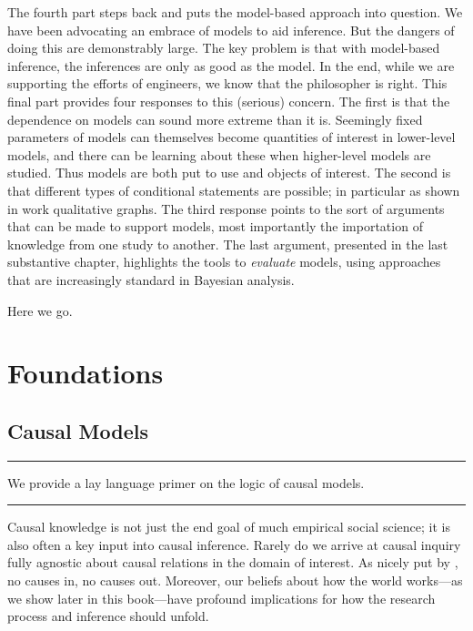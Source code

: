 \documentclass[
  12pt,
]{book}
\begin{document}
The fourth part steps back and puts the model-based approach into question. We have been advocating an embrace of models to aid inference. But the dangers of doing this are demonstrably large. The key problem is that with model-based inference, the inferences are only as good as the model. In the end, while we are supporting the efforts of engineers, we know that the philosopher is right. This final part provides four responses to this (serious) concern. The first is that the dependence on models can sound more extreme than it is. Seemingly fixed parameters of models can themselves become quantities of interest in lower-level models, and there can be learning about these when higher-level models are studied. Thus models are both put to use and objects of interest. The second is that different types of conditional statements are possible; in particular as shown in work qualitative graphs. The third response points to the sort of arguments that can be made to support models, most importantly the importation of knowledge from one study to another. The last argument, presented in the last substantive chapter, highlights the tools to \emph{evaluate} models, using approaches that are increasingly standard in Bayesian analysis.

Here we go.

\hypertarget{part-foundations}{%
\part{Foundations}\label{part-foundations}}

\hypertarget{models}{%
\chapter{Causal Models}\label{models}}

\begin{center}\rule{0.5\linewidth}{0.5pt}\end{center}

We provide a lay language primer on the logic of causal models.

\begin{center}\rule{0.5\linewidth}{0.5pt}\end{center}

Causal knowledge is not just the end goal of much empirical social science; it is also often a key input into causal inference.
Rarely do we arrive at causal inquiry fully agnostic about causal relations in the domain of interest. As nicely put by \citet{cartwright1994nature}, no causes in, no causes out.
Moreover, our beliefs about how the world works---as we show later in this book---have profound implications for how the research process and inference should unfold.
\end{document}
